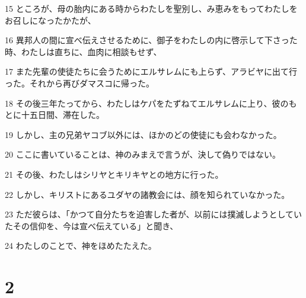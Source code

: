 \par 15 ところが、母の胎内にある時からわたしを聖別し、み恵みをもってわたしをお召しになったかたが、
\par 16 異邦人の間に宣べ伝えさせるために、御子をわたしの内に啓示して下さった時、わたしは直ちに、血肉に相談もせず、
\par 17 また先輩の使徒たちに会うためにエルサレムにも上らず、アラビヤに出て行った。それから再びダマスコに帰った。
\par 18 その後三年たってから、わたしはケパをたずねてエルサレムに上り、彼のもとに十五日間、滞在した。
\par 19 しかし、主の兄弟ヤコブ以外には、ほかのどの使徒にも会わなかった。
\par 20 ここに書いていることは、神のみまえで言うが、決して偽りではない。
\par 21 その後、わたしはシリヤとキリキヤとの地方に行った。
\par 22 しかし、キリストにあるユダヤの諸教会には、顔を知られていなかった。
\par 23 ただ彼らは、「かつて自分たちを迫害した者が、以前には撲滅しようとしていたその信仰を、今は宣べ伝えている」と聞き、
\par 24 わたしのことで、神をほめたたえた。

\chapter{2}

